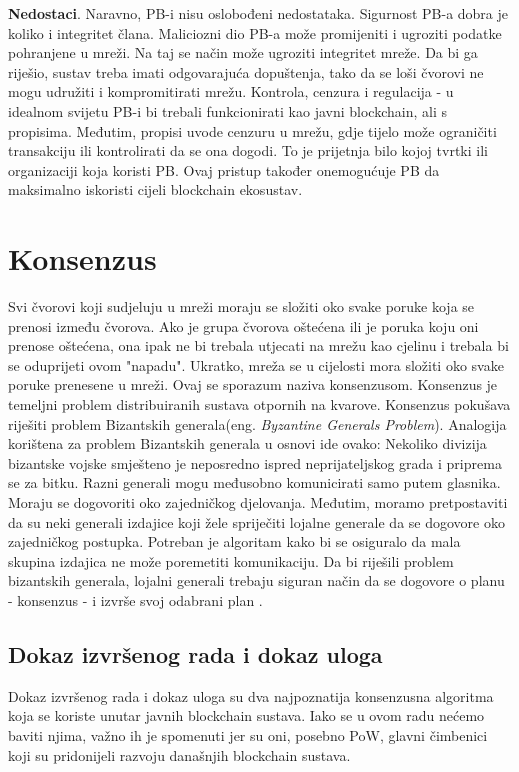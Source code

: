 \documentclass[times, utf8, diplomski]{fer}
\begin{document}
\textbf{Nedostaci}. Naravno, PB-i nisu oslobođeni nedostataka. Sigurnost PB-a dobra je koliko i integritet člana. Maliciozni dio PB-a može promijeniti i ugroziti podatke pohranjene u mreži. Na taj se način može ugroziti integritet mreže. Da bi ga riješio, sustav treba imati odgovarajuća dopuštenja, tako da se loši čvorovi ne mogu udružiti i kompromitirati mrežu. Kontrola, cenzura i regulacija - u idealnom svijetu PB-i bi trebali funkcionirati kao javni blockchain, ali s propisima. Međutim, propisi uvode cenzuru u mrežu, gdje tijelo može ograničiti transakciju ili kontrolirati da se ona dogodi. To je prijetnja bilo kojoj tvrtki ili organizaciji koja koristi PB. Ovaj pristup također onemogućuje PB da maksimalno iskoristi cijeli blockchain ekosustav.

\section{Konsenzus}
Svi čvorovi koji sudjeluju u mreži moraju se složiti oko svake poruke koja se prenosi između čvorova. Ako je grupa čvorova oštećena ili je poruka koju oni prenose oštećena, ona ipak ne bi trebala utjecati na mrežu kao cjelinu i trebala bi se oduprijeti ovom "napadu". Ukratko, mreža se u cijelosti mora složiti oko svake poruke prenesene u mreži. Ovaj se sporazum naziva konsenzusom. Konsenzus je temeljni problem distribuiranih sustava otpornih na kvarove. Konsenzus pokušava riješiti problem Bizantskih generala(eng.  \textit{Byzantine Generals Problem}).  Analogija korištena za problem Bizantskih generala u osnovi ide ovako: Nekoliko divizija bizantske vojske smješteno je neposredno ispred neprijateljskog grada i priprema se za bitku. Razni generali mogu međusobno komunicirati samo putem glasnika. Moraju se dogovoriti oko zajedničkog djelovanja. Međutim, moramo pretpostaviti da su neki generali izdajice koji žele spriječiti lojalne generale da se dogovore oko zajedničkog postupka. Potreban je algoritam kako bi se osiguralo da mala skupina izdajica ne može poremetiti komunikaciju. Da bi riješili problem bizantskih generala, lojalni generali trebaju siguran način da se dogovore o planu - konsenzus - i izvrše svoj odabrani plan \cite{impossibility}.

\subsection{Dokaz izvršenog rada i dokaz uloga}
Dokaz izvršenog rada i dokaz uloga su dva najpoznatija konsenzusna algoritma koja se koriste unutar javnih blockchain sustava. Iako se u ovom radu nećemo baviti njima, važno ih je spomenuti jer su oni, posebno PoW, glavni čimbenici koji su pridonijeli razvoju današnjih blockchain sustava.
\end{document}
